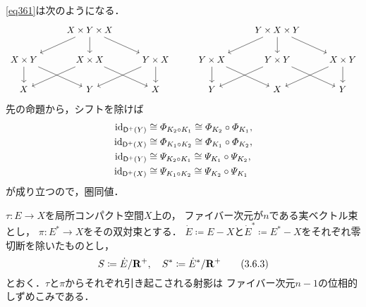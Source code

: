 \eqref{eq361}は次のようになる．
\begin{equation*}
    \begin{tikzcd}
        &X\times Y\times X
        \arrow[ld]
        \arrow[d]
        \arrow[rd]
        &&
        &Y\times X\times Y
        \arrow[ld]
        \arrow[d]
        \arrow[rd]
        &
        \\
        X\times Y 
        \arrow[d]
        \arrow[rd]&
        X\times X 
        \arrow[ld]
        \arrow[rd]&
        Y\times X 
        \arrow[ld]
        \arrow[d]
        &
        Y\times X 
        \arrow[d]
        \arrow[rd, very near end]&
        Y\times Y 
        \arrow[ld, very near end]
        \arrow[rd, very near end]&
        X\times Y 
        \arrow[ld, very near end]
        \arrow[d]
        \\
        X&Y&X
        &
        Y&X&Y
    \end{tikzcd}
\end{equation*}
先の命題から，シフトを除けば
\begin{align*}
    \mathop{\mathrm{id}}\nolimits_{\mathop{\mathsf{D}^\mathrm{+}}\nolimits(Y)}
    &\cong\varPhi_{K_2\circ K_1}
    \cong\varPhi_{K_2}\circ\varPhi_{K_1},\\
    \mathop{\mathrm{id}}\nolimits_{\mathop{\mathsf{D}^\mathrm{+}}\nolimits(X)}
    &\cong\varPhi_{K_1\circ K_2}
    \cong\varPhi_{K_1}\circ\varPhi_{K_2},\\
    \mathop{\mathrm{id}}\nolimits_{\mathop{\mathsf{D}^\mathrm{+}}\nolimits(Y)}
    &\cong\varPsi_{K_2\circ K_1}
    \cong\varPsi_{K_1}\circ\varPsi_{K_2},\\
    \mathop{\mathrm{id}}\nolimits_{\mathop{\mathsf{D}^\mathrm{+}}\nolimits(X)}
    &\cong\varPsi_{K_1\circ K_2}
    \cong\varPsi_{K_2}\circ\varPsi_{K_1}
\end{align*}
が成り立つので，圏同値．


\begin{EG}[{\cite[Example 3.6.6]{KS90}}]\label{366}
    \(\tau\colon E\to X\)を局所コンパクト空間\(X\)上の，
    ファイバー次元が\(n\)である実ベクトル束とし，
    \(\pi\colon E^\ast\to X\)をその双対束とする．
    \(\dot{E}\coloneqq E-X\)と\(
        \dot{E}^\ast\coloneqq E^\ast-X
    \)をそれぞれ零切断を除いたものとし，
    \begin{equation}
        S\coloneqq \dot{E}/\mathbf{R}^+,\quad
        S^\ast\coloneqq {\dot{E}^\ast}/\mathbf{R}^+\tag{3.6.3}\label{eq363}
    \end{equation}
    とおく．\(\tau\)と\(\pi\)からそれぞれ引き起こされる射影は
    ファイバー次元\(n-1\)の位相的しずめこみである．
\end{EG}

